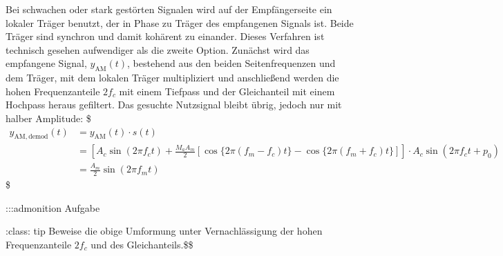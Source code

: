 \documentclass[letterpaper,10pt,english]{jupyterBook}
\begin{document}
\sphinxAtStartPar
Bei schwachen oder stark gestörten Signalen wird auf der Empfängerseite ein lokaler Träger benutzt, der in Phase zu Träger des empfangenen Signals ist. Beide Träger sind synchron und damit kohärent zu einander. Dieses Verfahren ist technisch gesehen aufwendiger als die zweite Option.
Zunächst wird das empfangene Signal, \(y_\mathrm{AM}(t)\), bestehend aus den beiden Seitenfrequenzen und dem Träger, mit dem lokalen Träger multipliziert und anschließend werden die hohen Frequenzanteile \(2f_c\) mit einem Tiefpass und der Gleichanteil mit einem Hochpass heraus gefiltert. Das gesuchte Nutzsignal bleibt übrig, jedoch nur mit halber Amplitude:
\$\(\begin{align} 
    y_\mathrm{AM,demod}(t) &= y_\mathrm{AM}(t) \cdot s(t) \\
    & = \left[ A_c \sin(2\pi  f_c  t)  + \frac{M_a A_m}{2} \left[ \cos\{2\pi(f_m-f_c)t \} - \cos\{2\pi(f_m+f_c)t \} \right] \right]  \cdot A_c \sin(2\pi f_c t + p_0) \\
    &= \frac{A_m}{2} \sin(2 \pi f_m t)
    \end{align}\)\$

\begin{sphinxVerbatim}[commandchars=\\\{\}]
:::\PYGZob{}admonition\PYGZcb{} Aufgabe
\end{sphinxVerbatim}

\sphinxAtStartPar
:class: tip
Beweise die obige Umformung unter Vernachlässigung der hohen Frequenzanteile \(2f_c\) und des Gleichanteils.\$\$
\end{document}
